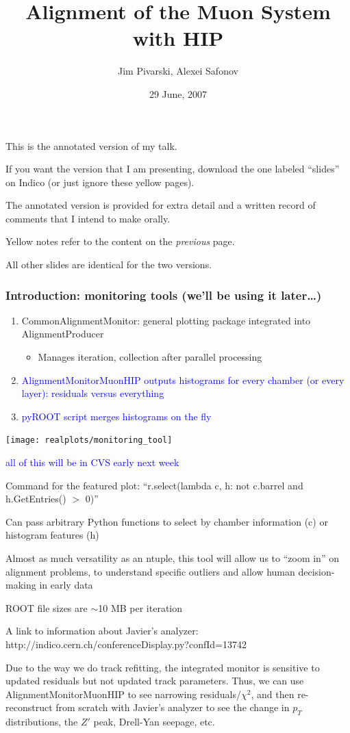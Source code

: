 \documentclass[compress]{beamer}
\title{Alignment of the Muon System with HIP}
\author{Jim Pivarski, Alexei Safonov}
\institute{Texas A\&M University}
\date{29 June, 2007}
\begin{document}
\frame{\titlepage}

\begin{notes}
\item This is the annotated version of my talk.
\item If you want the version that I am presenting, download the one
labeled ``slides'' on Indico (or just ignore these yellow pages).
\item The annotated version is provided for extra detail and a written
record of comments that I intend to make orally.
\item Yellow notes refer to the content on the {\it previous} page.
\item All other slides are identical for the two versions.
\end{notes}

\begin{frame}
\frametitle{Introduction: monitoring tools (we'll be using it later\ldots)}
\begin{enumerate}
\item CommonAlignmentMonitor: general plotting package integrated into AlignmentProducer
\begin{itemize}
\item Manages iteration, collection after parallel processing
\end{itemize}
\item \textcolor{blue}{AlignmentMonitorMuonHIP outputs histograms for every chamber (or every layer): residuals versus everything}
\item \textcolor{blue}{pyROOT script merges histograms on the fly}
\end{enumerate}
\begin{center}
\texttt{[image: realplots/monitoring\_tool]}

\textcolor{blue}{all of this will be in CVS early next week}
\end{center}
\end{frame}

\begin{notes}
\small
\item Command for the featured plot: ``r.select(lambda c, h: not c.barrel and h.GetEntries() $>$ 0)''
\item Can pass arbitrary Python functions to select by chamber information (c) or histogram features (h)
\item Almost as much versatility as an ntuple, this tool will allow us to
``zoom in'' on alignment problems, to understand specific outliers and
allow human decision-making in early data
\item ROOT file sizes are $\sim$10 MB per iteration
\item A link to information about Javier's analyzer: http://indico.cern.ch/conferenceDisplay.py?confId=13742
\item Due to the way we do track refitting, the integrated monitor is
sensitive to updated residuals but not updated track parameters.
Thus, we can use AlignmentMonitorMuonHIP to see narrowing
residuals/$\chi^2$, and then re-reconstruct from scratch with Javier's
analyzer to see the change in $p_T$ distributions, the $Z'$ peak,
Drell-Yan seepage, etc.
\end{notes}
\end{document}
